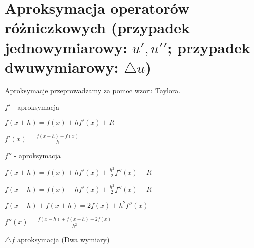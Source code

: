 \section{Aproksymacja operatorów różniczkowych (przypadek jednowymiarowy: ${u}', {{u}'}'$; przypadek dwuwymiarowy: $\bigtriangleup u$)}

Aproksymacje przeprowadzamy za pomoc wzoru Taylora. 

$f'$ - aproksymacja

$f(x+h) = f(x) + hf'(x) + R$

$f'(x) = \frac{f(x + h) - f(x)}{h}$

$f''$ - aproksymacja

$f(x+h) = f(x) + hf'(x) + \frac{h^2}{2}f''(x) + R$

$f(x-h) = f(x) - hf'(x) + \frac{h^2}{2}f''(x) + R$

$f(x-h) + f(x+h) = 2f(x) + h^2 f''(x)$

$f''(x) = \frac{f(x-h) + f(x+h) -2f(x)}{h^2} $

$\bigtriangleup f$ aproksymacja (Dwa wymiary)